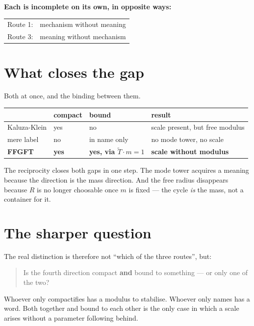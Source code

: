 \textbf{Each is incomplete on its own, in opposite ways:}
\begin{center}
\begin{tabular}{ll}
Route 1: & mechanism without meaning \\
Route 3: & meaning without mechanism \\
\end{tabular}
\end{center}

\section{What closes the gap}

Both at once, and the binding between them.

\begin{center}
\begin{tabular}{lllp{4.6cm}}
\toprule
 & compact & bound & result \\
\midrule
Kaluza-Klein & yes & no & scale present, but free modulus \\
mere label & no & in name only & no mode tower, no scale \\
\textbf{FFGFT} & \textbf{yes} & \textbf{yes, via $\tilde T \cdot m = 1$}
  & \textbf{scale without modulus} \\
\bottomrule
\end{tabular}
\end{center}

The reciprocity closes both gaps in one step. The mode tower acquires a
meaning because the direction is the mass direction. And the free
radius disappears because $R$ is no longer choosable once $m$ is fixed
--- the cycle \emph{is} the mass, not a container for it.

\section{The sharper question}

The real distinction is therefore not \enquote{which of the three
routes}, but:

\begin{quote}
Is the fourth direction compact \textbf{and} bound to something --- or
only one of the two?
\end{quote}

Whoever only compactifies has a modulus to stabilise. Whoever only
names has a word. Both together and bound to each other is the only
case in which a scale arises without a parameter following behind.

